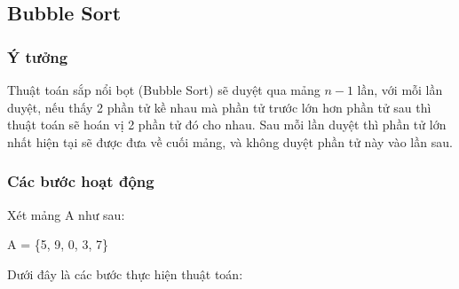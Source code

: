 \subsection{Bubble Sort}

\subsubsection{Ý tưởng}

Thuật toán sắp nổi bọt (Bubble Sort) sẽ duyệt qua mảng $n - 1$ lần, với mỗi lần duyệt, nếu thấy 2 phần tử kề nhau mà phần tử trước lớn hơn phần tử sau thì thuật toán sẽ hoán vị 2 phần tử đó cho nhau. Sau mỗi lần duyệt thì phần tử lớn nhất hiện tại sẽ được đưa về cuối mảng, và không duyệt phần tử này vào lần sau.

\subsubsection{Các bước hoạt động}
Xét mảng A như sau: 
\begin{center}
   A = \{5, 9, 0, 3, 7\} 
\end{center} 
Dưới đây là các bước thực hiện thuật toán:

